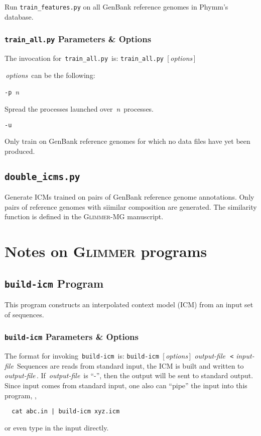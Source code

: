 \documentclass[fleqn,titlepage,11pt]{article}
\def\Desc#1{\,\mbox{\emph{#1}}\,}
\def\Glimmer{\textsc{Glimmer}}
\def\Gmg{\textsc{Glimmer-MG}}
\def\Pg#1{\texttt{#1}}
\begin{document}
Run \Pg{train\_features.py} on all GenBank reference genomes in
Phymm's database.

\subsubsection{\Pg{train\_all.py} Parameters \& Options}

The invocation for \,\Pg{train\_all.py}\, is:
\bq
  \Pg{train\_all.py}\, [\Desc{options}]
\eq

\Desc{options} can be the following:
\bl{}\RaggedRight

\exdent
  \verb`-p` \Desc{n}

  Spread the processes launched over \Desc{n} processes.

\exdent
  \verb`-u`

  Only train on GenBank reference genomes for which no data files
  have yet been produced.

\el

\subsection{\Pg{double\_icms.py}}

Generate ICMs trained on pairs of GenBank reference genome
annotations. Only pairs of reference genomes with siimilar composition
are generated. The similarity function is defined in the \Gmg{}
manuscript.



\section{Notes on \Glimmer{} programs}

\subsection{\Pg{build-icm} Program}

This program constructs an interpolated context model (ICM)
from an input set of sequences.

\subsubsection{\Pg{build-icm} Parameters \& Options}
The format for invoking \,\Pg{build-icm}\, is:
\bq
  \Pg{build-icm}\, [\Desc{options}] \Desc{output-file} \,\Pg{<}\,\Desc{input-file}
\eq
Sequences are reads from standard input, the ICM is
built and written to \Desc{output-file}.  If \Desc{output-file}
is ``-'', then the output will be sent to standard output.
Since input comes from standard input, one also can ``pipe'' the input
into this program, \eg,
\BSV
\begin{verbatim}
  cat abc.in | build-icm xyz.icm
\end{verbatim}
\ESV
or even type in the input directly.
\end{document}
